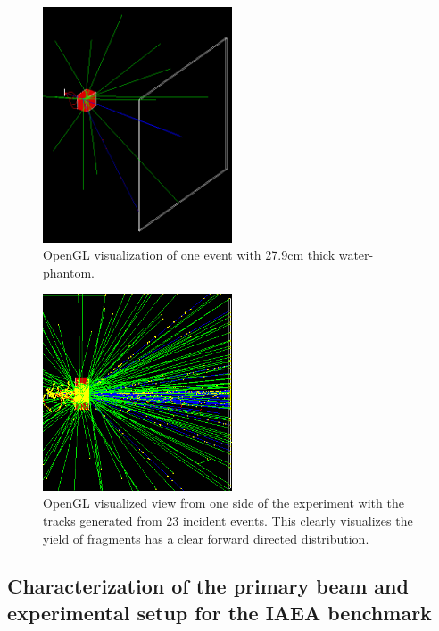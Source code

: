 \begin{figure}[ht] 
\begin{center}
\includegraphics[width=0.5\textwidth]{images/oneEvent.png}  
\caption{\label{fig:oneEvent} OpenGL visualization of one event with 27.9cm thick water-phantom.}
\end{center}
\end{figure}

\begin{figure}[ht] 
\begin{center}
\includegraphics[width=0.5\textwidth]{images/twentyEvents.png}  
\caption{\label{fig:twentyEvents} OpenGL visualized view from one side of the experiment with the tracks generated from 23 incident events. This clearly visualizes the yield of fragments has a clear forward directed distribution.}
\end{center}
\end{figure}


\subsection{Characterization of the primary beam and experimental setup for the
IAEA benchmark}

